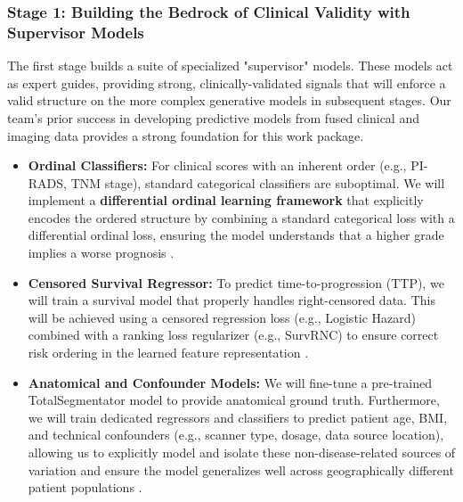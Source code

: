 \documentclass[11pt, a4paper]{article}
\begin{document}
\subsubsection{Stage 1: Building the Bedrock of Clinical Validity with Supervisor Models}
The first stage builds a suite of specialized "supervisor" models. These models act as expert guides, providing strong, clinically-validated signals that will enforce a valid structure on the more complex generative models in subsequent stages. Our team's prior success in developing predictive models from fused clinical and imaging data provides a strong foundation for this work package.
\begin{itemize}
    \item \textbf{Ordinal Classifiers:} For clinical scores with an inherent order (e.g., PI-RADS, TNM stage), standard categorical classifiers are suboptimal. We will implement a \textbf{differential ordinal learning framework} that explicitly encodes the ordered structure by combining a standard categorical loss with a differential ordinal loss, ensuring the model understands that a higher grade implies a worse prognosis \cite{LeeByeon2025, GrisiKartasalo2025}.
    \item \textbf{Censored Survival Regressor:} To predict time-to-progression (TTP), we will train a survival model that properly handles right-censored data. This will be achieved using a censored regression loss (e.g., Logistic Hazard) combined with a ranking loss regularizer (e.g., SurvRNC) to ensure correct risk ordering in the learned feature representation \cite{GaoLi2019, RivailVogl2023, ShahinZhao2023}.
    \item \textbf{Anatomical and Confounder Models:} We will fine-tune a pre-trained TotalSegmentator model to provide anatomical ground truth. Furthermore, we will train dedicated regressors and classifiers to predict patient age, BMI, and technical confounders (e.g., scanner type, dosage, data source location), allowing us to explicitly model and isolate these non-disease-related sources of variation and ensure the model generalizes well across geographically different patient populations \cite{PuglisiAlexander2025, ZhangHager2025}.
\end{itemize}
\end{document}
